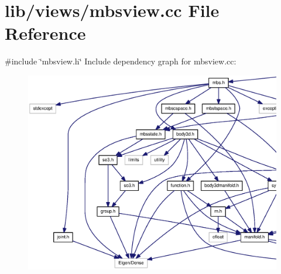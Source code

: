 \section{lib/views/mbsview.cc \-File \-Reference}
\label{mbsview_8cc}
{\ttfamily \#include \char`\"{}mbsview.\-h\char`\"{}}\*
\-Include dependency graph for mbsview.\-cc\-:\nopagebreak
\begin{figure}[H]
\begin{center}
\leavevmode
\includegraphics[width=350pt]{mbsview_8cc__incl}
\end{center}
\end{figure}
